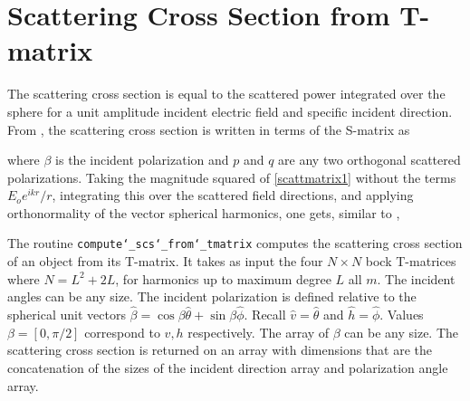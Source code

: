 \clearpage
{\footnotesize
{}
}

\section{Scattering Cross Section from T-matrix}

The scattering cross section is equal to the scattered power integrated over the sphere for a unit amplitude incident electric field and specific incident direction. From \cite{tsang1985theory}, the scattering cross section is written in terms of the S-matrix as 

\noindent where $\beta$ is the incident polarization and $p$ and $q$ are any two orthogonal scattered polarizations. Taking the magnitude squared of \eqref{scattmatrix1} without the terms $E_o e^{ikr}/r $, integrating this over the scattered field directions, and applying orthonormality of the vector spherical harmonics, one gets, similar to \cite{tsang1985theory},


The routine \texttt{compute\char`_scs\char`_from\char`_tmatrix} computes the scattering cross section of an object from its T-matrix. It takes as input the four $N \times N$ bock T-matrices where $N = L^2 + 2L$, for harmonics up to maximum degree $L$ all $m$.  The incident angles can be any size. The incident polarization is defined relative to the spherical unit vectors $\hat{\beta} = \cos \beta \hat{\theta} + \sin\beta \hat{\phi}$.  Recall $\hat{v} =\hat{\theta}$ and $\hat{h} =\hat{\phi}$. Values $\beta = [0,\pi/2]$ correspond to $v, h$ respectively. The array of $\beta$ can be any size. The scattering cross section is returned on an array with dimensions that are the concatenation of the sizes of the incident direction array and polarization angle array.  


